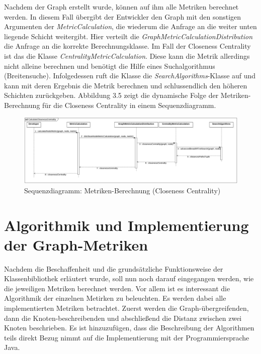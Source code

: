 \documentclass[a4paper,12pt,ngerman,chapterprefix=false,listof=totoc,bibliography=totoc]{scrreprt}
\begin{document}
{{{Nachdem der Graph erstellt wurde, können auf ihm alle Metriken berechnet werden. In diesem Fall übergibt der Entwickler den Graph mit den sonstigen Argumenten der \textit{MetricCalculation}, die wiederum die Anfrage an die weiter unten liegende Schicht weitergibt. Hier verteilt die \textit{GraphMetricCalculationDistribution} die Anfrage an die korrekte Berechnungsklasse. Im Fall der Closeness Centrality ist das die Klasse \textit{CentralityMetricCalculation}. Diese kann die Metrik allerdings nicht alleine berechnen und benötigt die Hilfe eines Suchalgorithmus (Breitensuche). Infolgedessen ruft die Klasse die \textit{SearchAlgorithms}-Klasse auf und kann mit deren Ergebnis die Metrik berechnen und schlussendlich den höheren Schichten zurückgeben. Abbildung 3.5 zeigt die dynamische Folge der Metriken-Berechnung für die Closeness Centrality in einem Sequenzdiagramm.
\begin{figure}[ht!]
	\centering
	\includegraphics[scale=.22]{Abbildungen/UML/sequence_metric_calc.png}
	\caption[Sequenzdiagramm: Metriken-Berechnung (Closeness Centrality)]{Sequenzdiagramm: Metriken-Berechnung (Closeness Centrality)}
\end{figure}
}
\section{Algorithmik und Implementierung der Graph-Metriken}
{
Nachdem die Beschaffenheit und die grundsätzliche Funktionsweise der Klassenbibliothek erläutert wurde, soll nun noch darauf eingegangen werden, wie die jeweiligen Metriken berechnet werden. Vor allem ist es interessant die Algorithmik der einzelnen Metirken zu beleuchten. Es werden dabei alle implementierten Metriken betrachtet. Zuerst werden die Graph-übergreifenden, dann die Knoten-beschreibenden und abschließend die Distanz zwischen zwei Knoten beschrieben. Es ist hinzuzufügen, dass die Beschreibung der Algorithmen teils direkt Bezug nimmt auf die Implementierung mit der Programmiersprache Java.
}
}}
\end{document}
